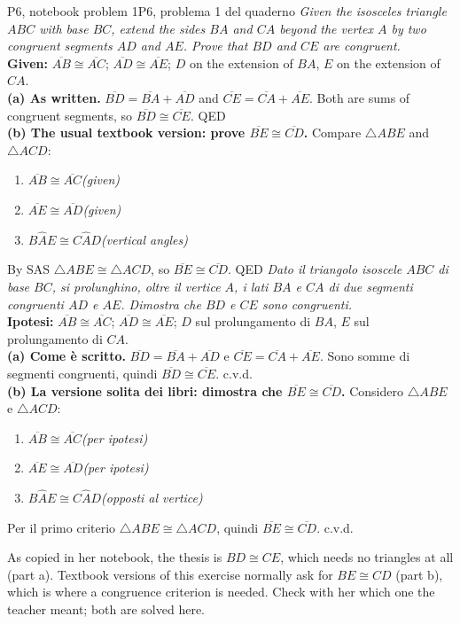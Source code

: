 \documentclass[10pt,a4paper,oneside]{book}
\newcommand{\ang}[3]{#1\widehat{#2}#3}      %
\newcommand{\seg}[1]{\overline{#1}}         %
\newcommand{\tri}[1]{\triangle #1}          %
\newcommand{\step}[2]{\item #1\hfill{\small\color{slate}\itshape(#2)}}
\newenvironment{steps}{\begin{enumerate}[label=\arabic*., leftmargin=1.5em, itemsep=1pt]}{\end{enumerate}}
\begin{document}
\begin{proofbox}{P6, notebook problem 1}{P6, problema 1 del quaderno}
\emph{Given the isosceles triangle $ABC$ with base $BC$, extend the sides $BA$ and $CA$ beyond the vertex $A$ by two congruent segments $AD$ and $AE$. Prove that $BD$ and $CE$ are congruent.}\\
\textbf{Given:} $\seg{AB} \cong \seg{AC}$; $\seg{AD} \cong \seg{AE}$; $D$ on the extension of $BA$, $E$ on the extension of $CA$.\\
\textbf{(a) As written.} $\seg{BD} = \seg{BA} + \seg{AD}$ and $\seg{CE} = \seg{CA} + \seg{AE}$. Both are sums of congruent segments, so $\seg{BD} \cong \seg{CE}$. \hfill QED\\
\textbf{(b) The usual textbook version: prove $\seg{BE} \cong \seg{CD}$.} Compare $\tri{ABE}$ and $\tri{ACD}$:
\begin{steps}
\step{$\seg{AB} \cong \seg{AC}$}{given}
\step{$\seg{AE} \cong \seg{AD}$}{given}
\step{$\ang{B}{A}{E} \cong \ang{C}{A}{D}$}{vertical angles}
\end{steps}
By SAS $\tri{ABE} \cong \tri{ACD}$, so $\seg{BE} \cong \seg{CD}$. \hfill QED
\tcblower
\emph{Dato il triangolo isoscele $ABC$ di base $BC$, si prolunghino, oltre il vertice $A$, i lati $BA$ e $CA$ di due segmenti congruenti $AD$ e $AE$. Dimostra che $BD$ e $CE$ sono congruenti.}\\
\textbf{Ipotesi:} $\seg{AB} \cong \seg{AC}$; $\seg{AD} \cong \seg{AE}$; $D$ sul prolungamento di $BA$, $E$ sul prolungamento di $CA$.\\
\textbf{(a) Come è scritto.} $\seg{BD} = \seg{BA} + \seg{AD}$ e $\seg{CE} = \seg{CA} + \seg{AE}$. Sono somme di segmenti congruenti, quindi $\seg{BD} \cong \seg{CE}$. \hfill c.v.d.\\
\textbf{(b) La versione solita dei libri: dimostra che $\seg{BE} \cong \seg{CD}$.} Considero $\tri{ABE}$ e $\tri{ACD}$:
\begin{steps}
\step{$\seg{AB} \cong \seg{AC}$}{per ipotesi}
\step{$\seg{AE} \cong \seg{AD}$}{per ipotesi}
\step{$\ang{B}{A}{E} \cong \ang{C}{A}{D}$}{opposti al vertice}
\end{steps}
Per il primo criterio $\tri{ABE} \cong \tri{ACD}$, quindi $\seg{BE} \cong \seg{CD}$. \hfill c.v.d.
\end{proofbox}

\begin{tutor}[about P6]
As copied in her notebook, the thesis is $BD \cong CE$, which needs no triangles at all (part a). Textbook versions of this exercise normally ask for $BE \cong CD$ (part b), which is where a congruence criterion is needed. Check with her which one the teacher meant; both are solved here.
\end{tutor}
\end{document}
